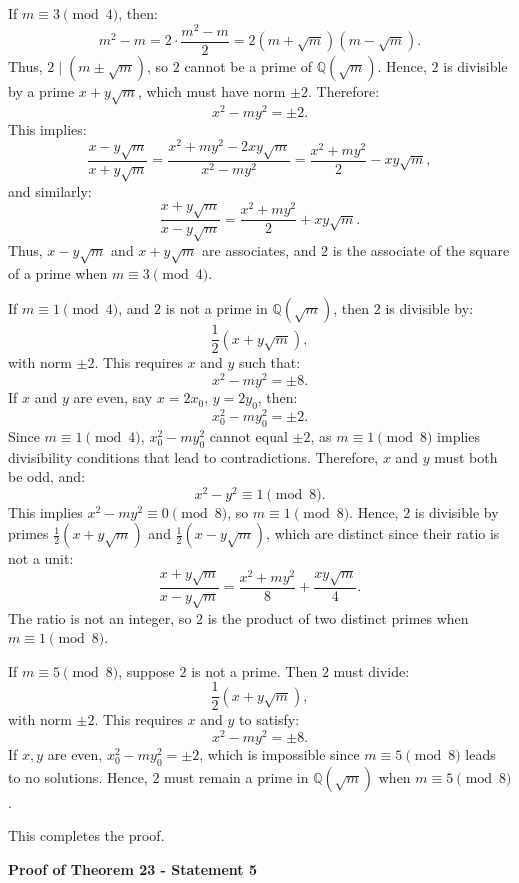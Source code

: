 \documentclass{article}
\newenvironment{proofbox}
  {\begin{mdframed}[linewidth=1pt,linecolor=black,backgroundcolor=white]\noindent\ignorespaces}
  {\end{mdframed}}
\begin{document}
\begin{proofbox}
    If \( m \equiv 3 \pmod{4} \), then:
\[
m^2 - m = 2 \cdot \frac{m^2 - m}{2} = 2(m + \sqrt{m})(m - \sqrt{m}).
\]
Thus, \( 2 \mid (m \pm \sqrt{m}) \), so \( 2 \) cannot be a prime of \( \mathbb{Q}(\sqrt{m}) \). Hence, \( 2 \) is divisible by a prime \( x + y\sqrt{m} \), which must have norm \( \pm 2 \). Therefore:
\[
x^2 - my^2 = \pm 2.
\]
This implies:
\[
\frac{x - y\sqrt{m}}{x + y\sqrt{m}} = \frac{x^2 + my^2 - 2xy\sqrt{m}}{x^2 - my^2} = \frac{x^2 + my^2}{2} - xy\sqrt{m},
\]
and similarly:
\[
\frac{x + y\sqrt{m}}{x - y\sqrt{m}} = \frac{x^2 + my^2}{2} + xy\sqrt{m}.
\]
Thus, \( x - y\sqrt{m} \) and \( x + y\sqrt{m} \) are associates, and \( 2 \) is the associate of the square of a prime when \( m \equiv 3 \pmod{4} \).

If \( m \equiv 1 \pmod{4} \), and \( 2 \) is not a prime in \( \mathbb{Q}(\sqrt{m}) \), then \( 2 \) is divisible by:
\[
\frac{1}{2}(x + y\sqrt{m}),
\]
with norm \( \pm 2 \). This requires \( x \) and \( y \) such that:
\[
x^2 - my^2 = \pm 8.
\]
If \( x \) and \( y \) are even, say \( x = 2x_0 \), \( y = 2y_0 \), then:
\[
x_0^2 - my_0^2 = \pm 2.
\]
Since \( m \equiv 1 \pmod{4} \), \( x_0^2 - my_0^2 \) cannot equal \( \pm 2 \), as \( m \equiv 1 \pmod{8} \) implies divisibility conditions that lead to contradictions. Therefore, \( x \) and \( y \) must both be odd, and:
\[
x^2 - y^2 \equiv 1 \pmod{8}.
\]
This implies \( x^2 - my^2 \equiv 0 \pmod{8} \), so \( m \equiv 1 \pmod{8} \). Hence, \( 2 \) is divisible by primes \( \frac{1}{2}(x + y\sqrt{m}) \) and \( \frac{1}{2}(x - y\sqrt{m}) \), which are distinct since their ratio is not a unit:
\[
\frac{x + y\sqrt{m}}{x - y\sqrt{m}} = \frac{x^2 + my^2}{8} + \frac{xy\sqrt{m}}{4}.
\]
The ratio is not an integer, so \( 2 \) is the product of two distinct primes when \( m \equiv 1 \pmod{8} \).

If \( m \equiv 5 \pmod{8} \), suppose \( 2 \) is not a prime. Then \( 2 \) must divide:
\[
\frac{1}{2}(x + y\sqrt{m}),
\]
with norm \( \pm 2 \). This requires \( x \) and \( y \) to satisfy:
\[
x^2 - my^2 = \pm 8.
\]
If \( x, y \) are even, \( x_0^2 - my_0^2 = \pm 2 \), which is impossible since \( m \equiv 5 \pmod{8} \) leads to no solutions. Hence, \( 2 \) must remain a prime in \( \mathbb{Q}(\sqrt{m}) \) when \( m \equiv 5 \pmod{8} \).

This completes the proof.

\end{proofbox}

\textbf{Proof of Theorem 23 - Statement 5}\\    
\end{document}
